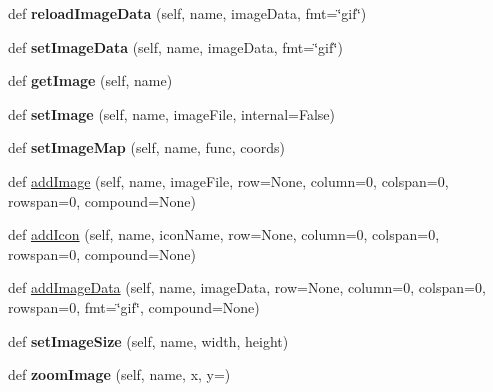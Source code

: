 \begin{DoxyCompactItemize}
def {\bfseries reload\+Image\+Data} (self, name, image\+Data, fmt=\char`\"{}gif\char`\"{})
\item 
\mbox{\label{class_python_01_g_u_i_1_1appjar_1_1gui_a772426e75441b894776bcdb34bd96a71}} 
def {\bfseries set\+Image\+Data} (self, name, image\+Data, fmt=\char`\"{}gif\char`\"{})
\item 
\mbox{\label{class_python_01_g_u_i_1_1appjar_1_1gui_aa78296f3263e8593c8cbb79be59d09e1}} 
def {\bfseries get\+Image} (self, name)
\item 
\mbox{\label{class_python_01_g_u_i_1_1appjar_1_1gui_a085d2df18f086bc4cdc8be986510ae1c}} 
def {\bfseries set\+Image} (self, name, image\+File, internal=False)
\item 
\mbox{\label{class_python_01_g_u_i_1_1appjar_1_1gui_af1f9b5a6c3d5784873fefdbbdd6e9aa5}} 
def {\bfseries set\+Image\+Map} (self, name, func, coords)
\item 
def \hyperlink{class_python_01_g_u_i_1_1appjar_1_1gui_ad04d73503d989881bdf2803d5546891d}{add\+Image} (self, name, image\+File, row=None, column=0, colspan=0, rowspan=0, compound=None)
\item 
def \hyperlink{class_python_01_g_u_i_1_1appjar_1_1gui_ae0d9a9f5abff94aa63f3df36f37f193e}{add\+Icon} (self, name, icon\+Name, row=None, column=0, colspan=0, rowspan=0, compound=None)
\item 
def \hyperlink{class_python_01_g_u_i_1_1appjar_1_1gui_a4f3e0f1fd7a19b00b0794dae152deee8}{add\+Image\+Data} (self, name, image\+Data, row=None, column=0, colspan=0, rowspan=0, fmt=\char`\"{}gif\char`\"{}, compound=None)
\item 
\mbox{\label{class_python_01_g_u_i_1_1appjar_1_1gui_af24924441d4566e72827e920d734a454}} 
def {\bfseries set\+Image\+Size} (self, name, width, height)
\item 
\mbox{\label{class_python_01_g_u_i_1_1appjar_1_1gui_ad2018c4fd6ecc9efe61cf35e5456b5e3}} 
def {\bfseries zoom\+Image} (self, name, x, y=\textquotesingle{}\textquotesingle{})
\item 
\mbox{\label{class_python_01_g_u_i_1_1appjar_1_1gui_ad0e5711f767d7f55cf6ad5cb444e3f27}} 

\end{DoxyCompactItemize}

